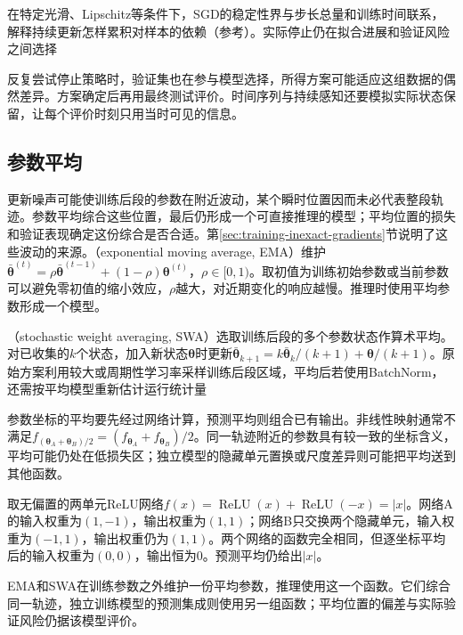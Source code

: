 在特定光滑、Lipschitz等条件下，SGD的稳定性界与步长总量和训练时间联系，解释持续更新怎样累积对样本的依赖（参考）。实际停止仍在拟合进展和验证风险之间选择

反复尝试停止策略时，验证集也在参与模型选择，所得方案可能适应这组数据的偶然差异。方案确定后再用最终测试评价。时间序列与持续感知还要模拟实际状态保留，让每个评价时刻只用当时可见的信息。

\subsection{参数平均}
\label{sec:generalization-weight-averaging}

更新噪声可能使训练后段的参数在附近波动，某个瞬时位置因而未必代表整段轨迹。参数平均综合这些位置，最后仍形成一个可直接推理的模型；平均位置的损失和验证表现确定这份综合是否合适。第\ref{sec:training-inexact-gradients}节说明了这些波动的来源。（exponential moving average, EMA）维护$\bar{\bm\theta}^{(t)}=\rho\bar{\bm\theta}^{(t-1)}+(1-\rho)\bm\theta^{(t)}$，$\rho\in[0,1)$。取初值为训练初始参数或当前参数可以避免零初值的缩小效应，$\rho$越大，对近期变化的响应越慢。推理时使用平均参数形成一个模型。

（stochastic weight averaging, SWA）选取训练后段的多个参数状态作算术平均。对已收集的$k$个状态，加入新状态$\bm\theta$时更新$\bar{\bm\theta}_{k+1}=k\bar{\bm\theta}_k/(k+1)+\bm\theta/(k+1)$。原始方案利用较大或周期性学习率采样训练后段区域，平均后若使用BatchNorm，还需按平均模型重新估计运行统计量

参数坐标的平均要先经过网络计算，预测平均则组合已有输出。非线性映射通常不满足$f_{(\bm\theta_A+\bm\theta_B)/2}=(f_{\bm\theta_A}+f_{\bm\theta_B})/2$。同一轨迹附近的参数具有较一致的坐标含义，平均可能仍处在低损失区；独立模型的隐藏单元置换或尺度差异则可能把平均送到其他函数。

\begin{example}[等价网络的参数平均可以失效]
  \label{ex:generalization-parameter-average}
  取无偏置的两单元ReLU网络$f(x)=\operatorname{ReLU}(x)+\operatorname{ReLU}(-x)=|x|$。网络A的输入权重为$(1,-1)$，输出权重为$(1,1)$；网络B只交换两个隐藏单元，输入权重为$(-1,1)$，输出权重仍为$(1,1)$。两个网络的函数完全相同，但逐坐标平均后的输入权重为$(0,0)$，输出恒为0。预测平均仍给出$|x|$。
\end{example}

EMA和SWA在训练参数之外维护一份平均参数，推理使用这一个函数。它们综合同一轨迹，独立训练模型的预测集成则使用另一组函数；平均位置的偏差与实际验证风险仍据该模型评价。

